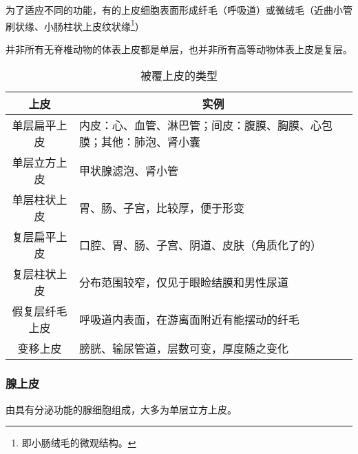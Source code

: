 为了适应不同的功能，有的上皮细胞表面形成纤毛（呼吸道）或微绒毛（近曲小管刷状缘、小肠柱状上皮纹状缘\footnote{即小肠绒毛的微观结构。}）

并非所有无脊椎动物的体表上皮都是单层，也并非所有高等动物体表上皮是复层。

\begin{table}[h!]
	\centering
	\begin{tabularx}{\textwidth}{|c|X|}
		\hline
		上皮 & \multicolumn{1}{c|}{实例} \\ \hline
		单层扁平上皮 & 内皮：\hspace{-0.5em}心\hspace{-0.25em}、\hspace{-0.5em}血管\hspace{-0.25em}、\hspace{-0.5em}淋巴管；\hspace{-0.5em}间皮：\hspace{-0.5em}腹膜\hspace{-0.25em}、\hspace{-0.5em}胸膜\hspace{-0.25em}、\hspace{-0.5em}心包膜；\hspace{-0.5em}其他：\hspace{-0.5em}肺泡\hspace{-0.25em}、\hspace{-0.5em}肾小囊 \\ \hline
		单层立方上皮 & 甲状腺滤泡、肾小管 \\ \hline
		单层柱状上皮 & 胃、肠、子宫，比较厚，便于形变 \\ \hline
		复层扁平上皮 & 口腔、胃、肠、子宫、阴道、皮肤（角质化了的） \\ \hline
		复层柱状上皮 & 分布范围较窄，仅见于眼睑结膜和男性尿道 \\ \hline
		假复层纤毛上皮 & 呼吸道内表面，在游离面附近有能摆动的纤毛 \\ \hline
		变移上皮 & 膀胱、输尿管道，层数可变，厚度随之变化 \\ \hline
	\end{tabularx}
	\caption{被覆上皮的类型}
	\label{tab:CoveringEpithelium}
\end{table}

\subsubsection{腺上皮}

由具有分泌功能的腺细胞组成，大多为单层立方上皮。

